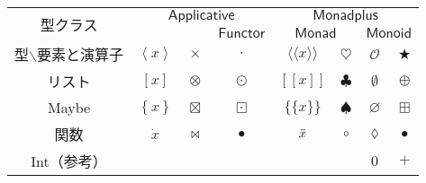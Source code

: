 \documentclass[twocolumn]{jsbook}
\def\[{[\![}
\def\]{]\!]}
\newcommand{\hsklTypeclass}[1]{\mathsf{#1}}
\newcommand{\hsklApplicative}{\hsklTypeclass{Applicative}}
\newcommand{\hsklFunctor}{\hsklTypeclass{Functor}}
\newcommand{\hsklMonad}{\hsklTypeclass{Monad}}
\newcommand{\hsklMonadplus}{\hsklTypeclass{Monadplus}}
\newcommand{\hsklMonoid}{\hsklTypeclass{Monoid}}
\newcommand{\anonymousparameter}{\lozenge}
\newcommand{\constantempty}{\emptyset}
\newcommand{\constantnothing}{\varnothing}
\newcommand{\binaryadd}{+}
\newcommand{\binarycompose}{\bullet}
\newcommand{\binaryfunctormap}{\cdot}
\newcommand{\binaryapplicativemap}{\times}
\newcommand{\binarymonadmap}{\heartsuit}%
\newcommand{\binarylistfunctormap}{\odot}
\newcommand{\binarylistapplicativemap}{\otimes}
\newcommand{\binarylistappend}{\oplus}
\newcommand{\binarymaybefunctormap}{\boxdot}
\newcommand{\binarymaybeapplicativemap}{\boxtimes}
\newcommand{\binarymaybeappend}{\boxplus}
\newcommand{\binaryfunctionfunctormap}{\binarycompose}
\newcommand{\binaryfunctionapplicativemap}{\Join}%
\newcommand{\applicativetype}[1]{\left\langle#1\right\rangle}
\newcommand{\listtype}[1]{\left[#1\right]}
\newcommand{\maybetype}[1]{\left\{#1\right\}}
\newcommand{\mathbinaryop}{\bigstar}
\newcommand{\mathidentity}{\mathcal{O}}
\begin{document}
\begin{table*}
\begin{center}
\begin{tabular}{||c||c|c|c|c|c|c|c||}
\hline
\multirow{2}{*}{型クラス}
    &\multicolumn{3}{|c|}{$\hsklApplicative$}
    &\multicolumn{4}{|c||}{$\hsklMonadplus$}\\
\cline{4-8}
\multirow{1}{*}{}
    &\multicolumn{2}{|c|}{ }
    &$\hsklFunctor$
    &\multicolumn{2}{|c}{$\hsklMonad$}
    &\multicolumn{2}{|c||}{$\hsklMonoid$}\\
\hline\hline
型$\backslash$要素と演算子
    &$\applicativetype{x}$
    &$\binaryapplicativemap$
    &$\binaryfunctormap$
    &$\langle\!\langle x\rangle\!\rangle$
    &$\binarymonadmap$
    &$\mathidentity$
    &$\mathbinaryop$\\
\hline
リスト
    &$\listtype{x}$
    &$\binarylistapplicativemap$
    &$\binarylistfunctormap$
    &$\[x\]$
    &$\clubsuit$
    &$\constantempty$
    &$\binarylistappend$\\
\hline
Maybe
    &$\maybetype{x}$
    &$\binarymaybeapplicativemap$
    &$\binarymaybefunctormap$
    &$\{\!\{x\}\!\}$
    &$\spadesuit$
    &$\constantnothing$
    &$\binarymaybeappend$\\
\hline
関数
    &$\Dot{x}$
    &$\binaryfunctionapplicativemap$
    &$\binaryfunctionfunctormap$
    &$\Ddot{x}$
    &$\circ$
    &$\anonymousparameter$
    &$\binarycompose$\\
\hline
Int（参考）
    &
    &
    &
    &
    &
    &$0$
    &$\binaryadd$\\
\hline
\end{tabular}
\end{center}
\end{table*}
\end{document}
